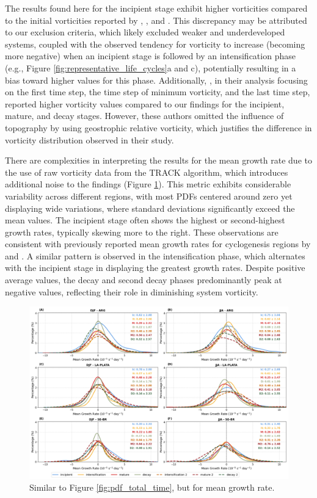 The results found here for the incipient stage exhibit higher vorticities compared to the initial vorticities reported by \citet{reboita2010south}, \citet{gramcianinov2019properties}, and \citet{gramcianinov2020analysis}. This discrepancy may be attributed to our exclusion criteria, which likely excluded weaker and underdeveloped systems, coupled with the observed tendency for vorticity to increase (becoming more negative) when an incipient stage is followed by an intensification phase (e.g., Figure \ref{fig:representative_life_cycles}a and c), potentially resulting in a bias toward higher values for this phase. Additionally, \citet{sinclair1995climatology}, in their analysis focusing on the first time step, the time step of minimum vorticity, and the last time step, reported higher vorticity values compared to our findings for the incipient, mature, and decay stages. However, these authors omitted the influence of topography by using geostrophic relative vorticity, which justifies the difference in vorticity distribution observed in their study.

There are complexities in interpreting the results for the mean growth rate due to the use of raw vorticity data from the TRACK algorithm, which introduces additional noise to the findings (Figure \ref{fig:pdf_mean_growth_rate}). This metric exhibits considerable variability across different regions, with most PDFs centered around zero yet displaying wide variations, where standard deviations significantly exceed the mean values. The incipient stage often shows the highest or second-highest growth rates, typically skewing more to the right. These observations are consistent with previously reported mean growth rates for cyclogenesis regions by \cite{hoskins2005new} and \cite{gramcianinov2019properties}. A similar pattern is observed in the intensification phase, which alternates with the incipient stage in displaying the greatest growth rates. Despite positive average values, the decay and second decay phases predominantly peak at negative values, reflecting their role in diminishing system vorticity.

\begin{figure}[!htbp]
\centering
\includegraphics[width=\textwidth]{figs_4/pdf_mean_growth_rate.png}
\caption[PDF - Mean Growth Rate]{Similar to Figure \ref{fig:pdf_total_time}, but for mean growth rate.}
\label{fig:pdf_mean_growth_rate}
\end{figure}


